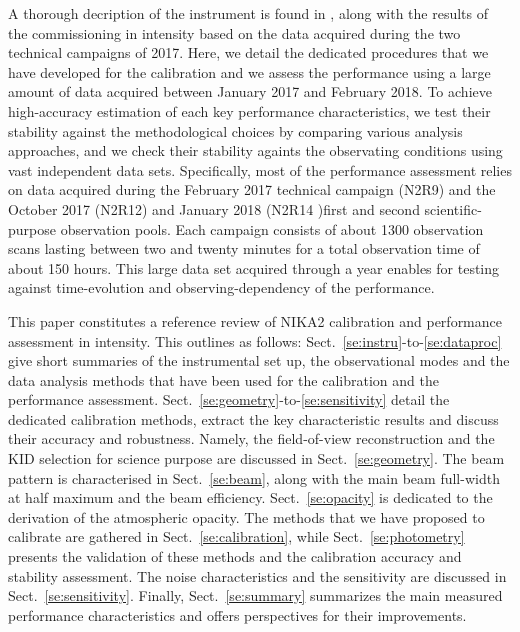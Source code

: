 A thorough decription of the instrument is found in \citet{Adam2017},
along with the results of the commissioning in intensity based on the
data acquired during the two technical campaigns of 2017. Here, we
detail the dedicated procedures that we have developed for the
calibration and we assess the performance using a large amount of
data acquired between January 2017 and February 2018. To achieve
high-accuracy estimation of each key performance characteristics,
we test their stability against the methodological choices by
comparing various analysis approaches, and we check their stability
againts the observating conditions using vast independent data sets.
Specifically, most of the performance assessment relies on data
acquired during the February 2017 technical campaign (N2R9) and the
October 2017 (N2R12) and January 2018 (N2R14 )first and second
scientific-purpose observation pools. Each campaign consists of about
1300 observation scans lasting between two and twenty minutes for a
total observation time of about 150 hours. This large data set
acquired through a year enables for testing against time-evolution and
observing-dependency of the performance.

This paper constitutes a reference review of NIKA2 calibration and
performance assessment in intensity. This outlines as follows:
Sect.~\ref{se:instru}-to-\ref{se:dataproc} give short summaries of the
instrumental set up, the observational modes and the data analysis methods
that have been used for the calibration and the performance
assessment. Sect.~\ref{se:geometry}-to-\ref{se:sensitivity} detail the
dedicated calibration methods, extract the key characteristic results
and discuss their accuracy and robustness. Namely, the field-of-view
reconstruction and the KID selection for science purpose are discussed
in Sect.~\ref{se:geometry}. The beam pattern is characterised in
Sect.~\ref{se:beam}, along with the main beam
full-width at half maximum and the beam
efficiency. Sect.~\ref{se:opacity} is dedicated to the derivation of
the atmospheric opacity. The methods that we have proposed to
calibrate are gathered in Sect.~\ref{se:calibration}, while
Sect.~\ref{se:photometry} presents the validation of these methods and
the calibration accuracy and stability assessment. The noise
characteristics and the sensitivity are discussed in
Sect.~\ref{se:sensitivity}. Finally, Sect.~\ref{se:summary} summarizes
the main measured performance characteristics and offers perspectives
for their improvements. 















